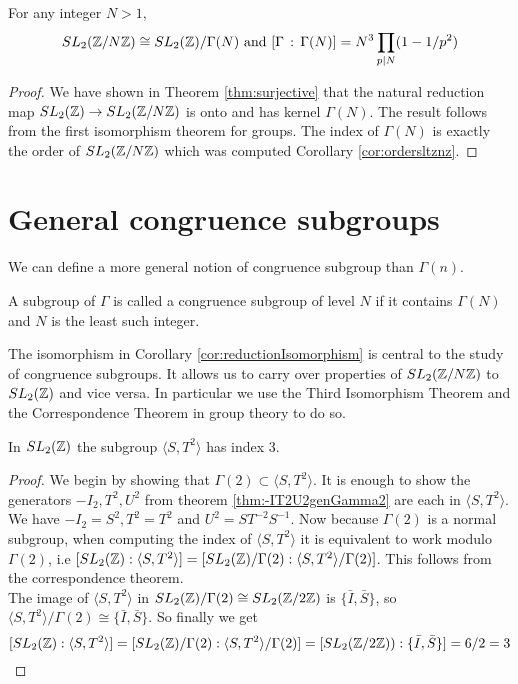 \begin{corollary}\label{cor:reductionIsomorphism}
For any integer $N > 1$, 
$$\sltznz \cong \sltz / \Gamma(N) \text{ and } [\Gamma \, : \,  \Gamma(N)] =  N^3  \prod_{p\mid N}(1 - 1/p^2)$$
\end{corollary}

\begin{proof}
We have shown in Theorem \ref{thm:surjective} that the natural reduction map $\sltz \rightarrow \sltznz$ is onto and has kernel $\Gamma(N)$. The result follows from the first isomorphism theorem for groups. The index of $\Gamma(N)$ is exactly the order of $\sltznz$ which was computed Corollary \ref{cor:ordersltznz}.
\end{proof}
\section{General congruence subgroups}
We can define a more general notion of congruence subgroup than $\Gamma(n)$.
\begin{definition}
A subgroup of $\Gamma$ is called a congruence subgroup of level $N$ if it contains $\Gamma(N)$ and $N$ is the least such integer.
\end{definition}
The isomorphism in Corollary \ref{cor:reductionIsomorphism} is central to the study of congruence subgroups. It allows us to carry over properties of $\sltznz$ to $\sltz$ and vice versa. In particular we use the Third Isomorphism Theorem and the Correspondence Theorem in group theory to do so.


\begin{corollary}\label{cor:index3}
In $\sltz$ the subgroup $\langle S, T^2 \rangle$ has index $3$.
\end{corollary}

\begin{proof}
We begin by showing that $\Gamma(2) \subset \langle S, T^2 \rangle$. It is enough to show the generators $-I_2,T^2,U^2$ from theorem \ref{thm:-IT2U2genGamma2} are each in $\langle S, T^2 \rangle$. We have $-I_2 = S^2, T^2 = T^2$ and $ U^2 = ST^{-2}S^{-1}$. Now because $\Gamma(2)$ is a normal subgroup, when computing the index of $\langle S, T^2 \rangle$ it is equivalent to work modulo $\Gamma(2)$, i.e $[\sltz : \langle S, T^2 \rangle] = [\sltz / \Gamma(2) : \langle S, T^2 \rangle  / \Gamma(2)]$. This follows from the correspondence theorem. \\
The image of $\langle S, T^2 \rangle$ in $\sltz / \Gamma(2) \cong \sltznz[2] $ is $\{ \bar{I}, \bar{S} \}$, so $\langle S, T^2 \rangle  / \Gamma(2) \cong \{ \bar{I}, \bar{S} \}$. So finally we get
$$ [\sltz : \langle S, T^2 \rangle] = [\sltz / \Gamma(2) : \langle S, T^2 \rangle  / \Gamma(2)] = [ \sltznz[2]) : \{\bar{I}, \bar{S} \}] = 6/2 = 3 $$
\end{proof}

